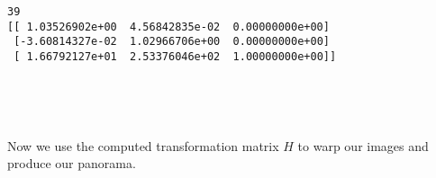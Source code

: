 \documentclass[11pt]{article}
\begin{document}
    \begin{Verbatim}[commandchars=\\\{\}]
39
[[ 1.03526902e+00  4.56842835e-02  0.00000000e+00]
 [-3.60814327e-02  1.02966706e+00  0.00000000e+00]
 [ 1.66792127e+01  2.53376046e+02  1.00000000e+00]]

    \end{Verbatim}

    \begin{center}
    \end{center}
    { \hspace*{\fill} \\}
    
    \begin{center}
    \end{center}
    { \hspace*{\fill} \\}
    
    Now we use the computed transformation matrix \(H\) to warp our images
and produce our panorama.
\end{document}
